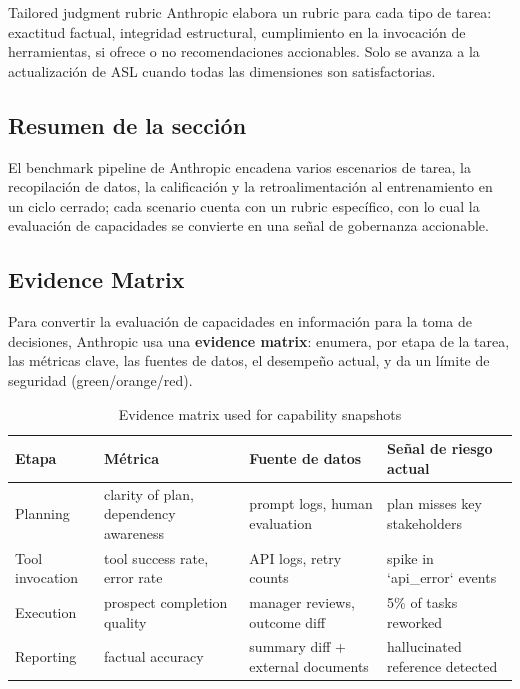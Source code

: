 \documentclass[a4paper]{article}
\begin{document}
\begin{knowledgebox}{Tailored judgment rubric}
Anthropic elabora un rubric para cada tipo de tarea: exactitud factual, integridad estructural, cumplimiento en la invocación de herramientas, si ofrece o no recomendaciones accionables. Solo se avanza a la actualización de ASL cuando todas las dimensiones son satisfactorias.
\end{knowledgebox}

\subsection{Resumen de la sección}

El benchmark pipeline de Anthropic encadena varios escenarios de tarea, la recopilación de datos, la calificación y la retroalimentación al entrenamiento en un ciclo cerrado; cada scenario cuenta con un rubric específico, con lo cual la evaluación de capacidades se convierte en una señal de gobernanza accionable.

\subsection{Evidence Matrix}

Para convertir la evaluación de capacidades en información para la toma de decisiones, Anthropic usa una \textbf{evidence matrix}: enumera, por etapa de la tarea, las métricas clave, las fuentes de datos, el desempeño actual, y da un límite de seguridad (green/orange/red).

\begin{table}[H]
\centering
\begin{tabular}{p{}p{}p{}p{}}
\toprule
Etapa & Métrica & Fuente de datos & Señal de riesgo actual \\
\midrule
Planning & clarity of plan, dependency awareness & prompt logs, human evaluation & plan misses key stakeholders \\
Tool invocation & tool success rate, error rate & API logs, retry counts & spike in `api\_error` events \\
Execution & prospect completion quality & manager reviews, outcome diff & 5\% of tasks reworked \\
Reporting & factual accuracy & summary diff + external documents & hallucinated reference detected \\
\bottomrule
\end{tabular}
\caption{Evidence matrix used for capability snapshots}
\end{table}
\end{document}
